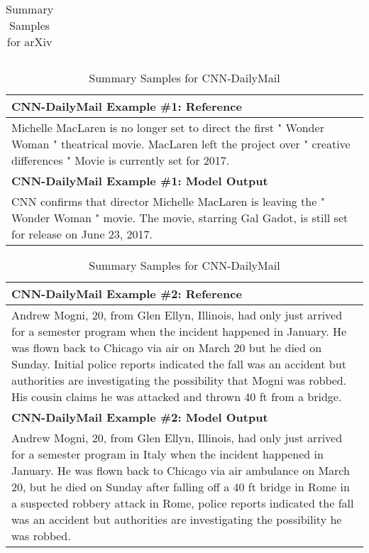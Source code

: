 \documentclass{article} \usepackage{iclr2022_conference,times}
\begin{document}
\begin{table}[!htbp]
\begin{tabular}{p{\linewidth}}
\\
    \bottomrule
    \end{tabular}
    \caption{
    Summary Samples for arXiv
    }
\end{table}



\begin{table}[!htbp]
    \centering
    \tiny
    \begin{tabular}{p{\linewidth}} 
    \toprule
    \textbf{CNN-DailyMail Example \#1: Reference} \\
    \midrule
Michelle MacLaren is no longer set to direct the first " Wonder Woman " theatrical movie. MacLaren left the project over " creative differences " Movie is currently set for 2017.
    \\
    \midrule
    \textbf{CNN-DailyMail Example \#1: Model Output} \\
    \midrule
CNN confirms that director Michelle MacLaren is leaving the " Wonder Woman " movie. The movie, starring Gal Gadot, is still set for release on June 23, 2017.
    \\
    \end{tabular}
    \begin{tabular}{p{\linewidth}} 
    \midrule
    \textbf{CNN-DailyMail Example \#2: Reference} \\
    \midrule
Andrew Mogni, 20, from Glen Ellyn, Illinois, had only just arrived for a semester program when the incident happened in January. He was flown back to Chicago via air on March 20 but he died on Sunday. Initial police reports indicated the fall was an accident but authorities are investigating the possibility that Mogni was robbed. His cousin claims he was attacked and thrown 40 ft from a bridge.
    \\
    \midrule
    \textbf{CNN-DailyMail Example \#2: Model Output} \\
    \midrule
Andrew Mogni, 20, from Glen Ellyn, Illinois, had only just arrived for a semester program in Italy when the incident happened in January. He was flown back to Chicago via air ambulance on March 20, but he died on Sunday after falling off a 40 ft bridge in Rome in a suspected robbery attack in Rome, police reports indicated the fall was an accident but authorities are investigating the possibility he was robbed.
    \\
    \bottomrule
    \end{tabular}
    \caption{
    Summary Samples for CNN-DailyMail
    }
\end{table}
\end{document}
